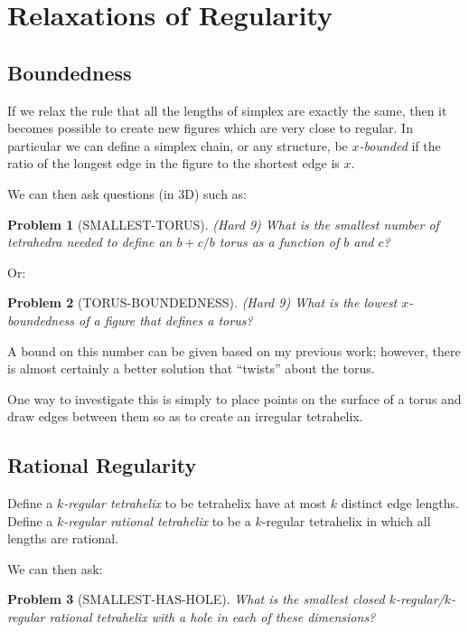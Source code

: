 \documentclass[11pt]{article}
\newtheorem{problem}{Problem}
\begin{document}
\section{Relaxations of Regularity}
\subsection{Boundedness}

If we relax the rule that all the lengths of simplex are exactly the same, then it becomes possible to create new figures which are
very close to regular. In particular we can define a simplex chain, or any structure, be {\em $x$-bounded} if the ratio of the longest edge
in the figure to the shortest edge is $x$.

We can then ask questions (in 3D) such as:

\begin{problem}[SMALLEST-TORUS]
(Hard 9)  What is the smallest number of tetrahedra needed to define an $b+c/b$ torus as a function of $b$ and $c$?
  \end{problem}

Or:

\begin{problem}[TORUS-BOUNDEDNESS]
(Hard 9)  What is the lowest $x$-boundedness of a figure that defines a torus?
  \end{problem}

A bound on this number can be given based on my previous work; however, there is almost certainly a better solution that ``twists'' about the torus.

One way to investigate this is simply to place points on the surface of a torus and draw edges between them so as to create an irregular tetrahelix.

\subsection{Rational Regularity}

Define a {\em $k$-regular tetrahelix} to be tetrahelix have at most $k$ distinct edge lengths.
Define a {\em $k$-regular rational tetrahelix} to be a $k$-regular tetrahelix in which all lengths are rational.

We can then ask:

\begin{problem}[SMALLEST-HAS-HOLE]
  What is the smallest closed $k$-regular/$k$-regular rational tetrahelix with a hole in each of these dimensions?
\end{problem}
\end{document}
